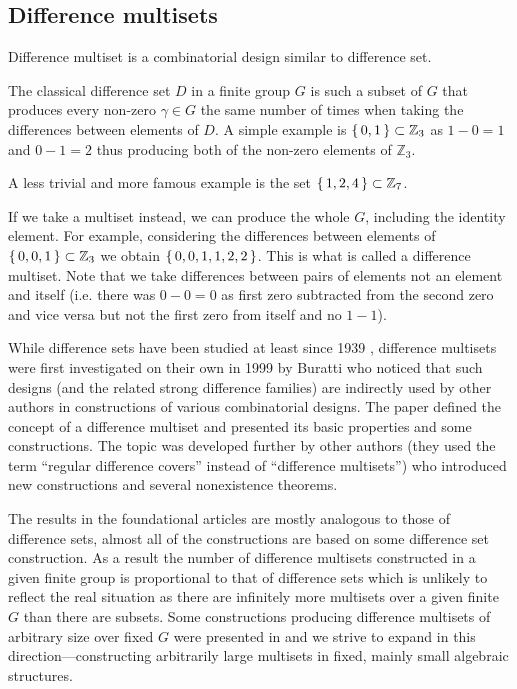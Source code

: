 \subsection{Difference multisets}

	Difference multiset is a combinatorial design similar to 
	difference set.

	The classical difference set $D$ in a finite group $G$ is such a 
	subset of $G$ that produces every non-zero $\gamma \in G$ the 
	same number of times when taking the differences between elements
	of $D$. A simple example is $\set{0,1} \subset \mathbb Z_3$ as 
	$1-0=1$ and $0-1=2$ thus producing both of the non-zero elements
	 of $\mathbb Z_3$. 

	A less trivial and more famous example is the set 
	$\set{1,2,4} \subset \mathbb Z_7$.

	If we take a multiset instead, we can produce the whole $G$, 
	including the identity element. For example, considering the 
	differences between elements of $\set{0,0,1} \subset \mathbb Z_3$ 
	we obtain $\set{0,0,1,1,2,2}$. This is what is called a 
	difference multiset. Note that we take differences between pairs 
	of elements not an element and itself (i.e. there was $0-0=0$ as 
	first zero subtracted from the second zero and vice versa but not 
	the first zero from itself and no $1-1$).

	While difference sets have been studied at least since 1939 
	\cite{bose1939construction}, difference multisets were first 
	investigated on their own in 1999 by Buratti \cite{buratti1999old} 
	who noticed that such designs (and the related strong difference 
	families) are indirectly used by other authors in constructions 
	of various combinatorial designs. The paper defined the concept 
	of a difference multiset and presented its basic properties and 
	some constructions. The topic was developed further by other 
	authors \cite{arasu2005cyclic, arasu2005regular} (they used the 
	term ``regular difference covers'' instead of ``difference 
	multisets'') who introduced new constructions and several 
	nonexistence theorems.

	The results in the foundational articles are mostly analogous to 
	those of difference sets, almost all of the constructions are 
	based on some difference set construction. As a result the number 
	of difference multisets constructed in a given finite group is 
	proportional to that of difference sets which is unlikely to 
	reflect the real situation as there are infinitely more multisets 
	over a given finite $G$ than there are subsets. Some constructions 
	producing difference multisets of arbitrary size over fixed $G$ 
	were presented in \cite{momihara2009strong} and we strive to 
	expand in this direction---constructing arbitrarily large
	multisets in fixed, mainly small algebraic structures.

